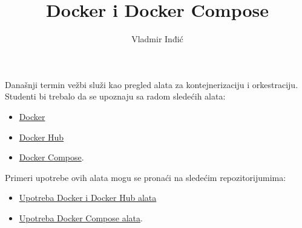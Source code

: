 \documentclass[11pt]{article}
\author{Vladmir Inđić}
\date{}
\title{Docker i Docker Compose}
\begin{document}
\maketitle
Današnji termin vežbi služi kao pregled alata za kontejnerizaciju i orkestraciju.
Studenti bi trebalo da se upoznaju sa radom sledećih alata:
\begin{itemize}
\item \href{https://github.com/vladaindjic/SCM-exchange-students\#docker}{Docker}
\item \href{https://github.com/vladaindjic/SCM-exchange-students\#docker-hub}{Docker Hub}
\item \href{https://github.com/vladaindjic/SCM-exchange-students\#docker-compose}{Docker Compose}.
\end{itemize}

Primeri upotrebe ovih alata mogu se pronaći na sledećim repozitorijumima:
\begin{itemize}
\item \href{https://github.com/vladaindjic/DjangoAuthTests}{Upotreba Docker i Docker Hub alata}
\item \href{https://github.com/vladaindjic/DjangoMimicProduction}{Upotreba Docker Compose alata}.
\end{itemize}
\end{document}
